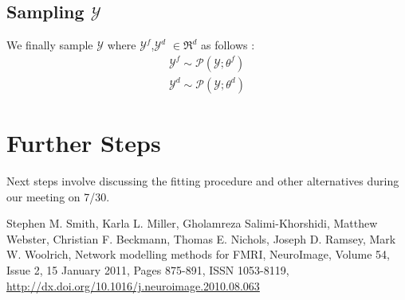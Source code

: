 \documentclass[a4paper,10pt]{article}
\begin{document}
\subsection{Sampling $\mathcal{Y}$}
We finally sample $\mathcal{Y}$ where $\mathcal{Y}^{f}$,$\mathcal{Y}^{d}$ $\in \Re^{d}$ as follows :
\begin{align*}
\mathcal{Y}^{f} \sim \mathcal{P}(\mathcal{Y};\theta^{f})\\
\mathcal{Y}^{d} \sim \mathcal{P}(\mathcal{Y};\theta^{d})
\end{align*}
\section{Further Steps}
Next steps involve discussing the fitting procedure and other alternatives during our meeting on 7/30. 
\begin{thebibliography}{99}
     Stephen M. Smith, Karla L. Miller, Gholamreza Salimi-Khorshidi, Matthew Webster, Christian F. Beckmann, Thomas E. Nichols, Joseph D. Ramsey, Mark W. Woolrich, Network modelling methods for FMRI, NeuroImage, Volume 54, Issue 2, 15 January 2011, Pages 875-891, ISSN 1053-8119, \url{http://dx.doi.org/10.1016/j.neuroimage.2010.08.063}

    
\end{thebibliography}
\end{document}
